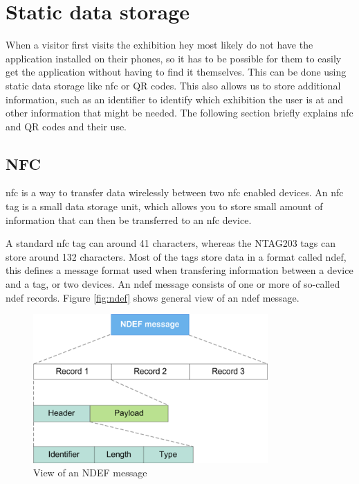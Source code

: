 \chapter*{Static data storage}
When a visitor first visits the exhibition hey most likely do not have the application installed on their phones, so it has to be possible for them to easily get the application without having to find it themselves. This can be done using static data storage like \ac{nfc} or QR codes. This also allows us to store additional information, such as an identifier to identify which exhibition the user is at and other information that might be needed. The following section briefly explains \ac{nfc} and QR codes and their use. 

\section*{NFC}
\ac{nfc} is a way to transfer data wirelessly  between two \ac{nfc} enabled devices. 
An \ac{nfc} tag is a small data storage unit, which allows you to store small amount of information that can then be transferred to an \ac{nfc} device. 

A standard \ac{nfc} tag can around 41 characters, whereas the NTAG203 tags can store around 132 characters\citep{nfccap}. Most of the tags store data in a format called \ac{ndef}, this defines a message format used when transfering information between a device and a tag, or two devices. An \ac{ndef} message consists of one or more of so-called \ac{ndef} records. Figure \autoref{fig:ndef} shows general view of an \ac{ndef} message.

\begin{figure}[H]
\centering
\includegraphics[width=0.8\textwidth]{img/nfcrecord.png}
\caption{View of an NDEF message\citep{ndef}}
\label{fig:ndef}
\end{figure}


